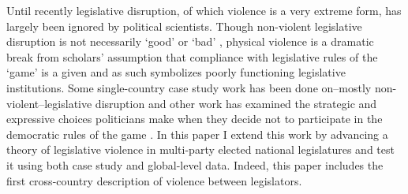 \documentclass[a4paper]{article}\usepackage[]{graphicx}\usepackage[]{color}
\begin{document}
Until recently legislative disruption, of which violence is a very extreme form, has largely been ignored by political scientists. Though non-violent legislative disruption is not necessarily `good' or `bad' \citep[see][for discussions of how non-violent disruption may act as a  `safety valve']{Ostrow1996,Young2002}, physical violence is a dramatic break from scholars' assumption that compliance with legislative rules of the `game' is a given \citep{Wolfe2004} and as such symbolizes poorly functioning legislative institutions. Some single-country case study work has been done on--mostly non-violent--legislative disruption \cite[see][]{Armitage2013,Johnson2013,Ilie2013,Wolfe2004} and other work has examined the strategic and expressive choices politicians make when they decide not to participate in the democratic rules of the game \citep[e.g.][]{wilkinson2006,Beaulieu2008,Spary2013,BeaulieuForthcoming}. In this paper I extend this work by advancing a theory of legislative violence in multi-party elected national legislatures and test it using both case study and global-level data. Indeed, this paper includes the first cross-country description of violence between legislators. 
\end{document}
